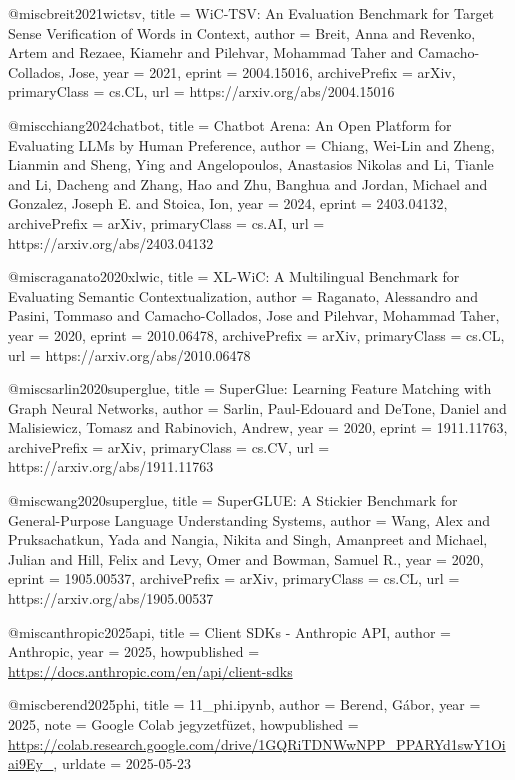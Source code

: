 \documentclass[12pt]{report}
\theoremstyle{definition}
\begin{document}
@misc{breit2021wictsv,
  title = {{WiC-TSV}: An Evaluation Benchmark for Target Sense Verification of Words in Context},
  author = {Breit, Anna and Revenko, Artem and Rezaee, Kiamehr and Pilehvar, Mohammad Taher and Camacho-Collados, Jose},
  year = {2021},
  eprint = {2004.15016},
  archivePrefix = {arXiv},
  primaryClass = {cs.CL},
  url = {https://arxiv.org/abs/2004.15016}
}

@misc{chiang2024chatbot,
  title = {Chatbot Arena: An Open Platform for Evaluating {LLMs} by Human Preference},
  author = {Chiang, Wei-Lin and Zheng, Lianmin and Sheng, Ying and Angelopoulos, Anastasios Nikolas and Li, Tianle and Li, Dacheng and Zhang, Hao and Zhu, Banghua and Jordan, Michael and Gonzalez, Joseph E. and Stoica, Ion},
  year = {2024},
  eprint = {2403.04132},
  archivePrefix = {arXiv},
  primaryClass = {cs.AI},
  url = {https://arxiv.org/abs/2403.04132}
}

@misc{raganato2020xlwic,
  title = {{XL-WiC}: A Multilingual Benchmark for Evaluating Semantic Contextualization},
  author = {Raganato, Alessandro and Pasini, Tommaso and Camacho-Collados, Jose and Pilehvar, Mohammad Taher},
  year = {2020},
  eprint = {2010.06478},
  archivePrefix = {arXiv},
  primaryClass = {cs.CL},
  url = {https://arxiv.org/abs/2010.06478}
}

@misc{sarlin2020superglue,
  title = {{SuperGlue}: Learning Feature Matching with Graph Neural Networks},
  author = {Sarlin, Paul-Edouard and DeTone, Daniel and Malisiewicz, Tomasz and Rabinovich, Andrew},
  year = {2020},
  eprint = {1911.11763},
  archivePrefix = {arXiv},
  primaryClass = {cs.CV},
  url = {https://arxiv.org/abs/1911.11763}
}

@misc{wang2020superglue,
  title = {{SuperGLUE}: A Stickier Benchmark for General-Purpose Language Understanding Systems},
  author = {Wang, Alex and Pruksachatkun, Yada and Nangia, Nikita and Singh, Amanpreet and Michael, Julian and Hill, Felix and Levy, Omer and Bowman, Samuel R.},
  year = {2020},
  eprint = {1905.00537},
  archivePrefix = {arXiv},
  primaryClass = {cs.CL},
  url = {https://arxiv.org/abs/1905.00537}
}

@misc{anthropic2025api,
  title = {Client {SDKs} - {Anthropic} {API}},
  author = {Anthropic},
  year = {2025},
  howpublished = {\url{https://docs.anthropic.com/en/api/client-sdks}}
}

@misc{berend2025phi,
  title = {11\_phi.ipynb},
  author = {Berend, Gábor},
  year = {2025},
  note = {Google Colab jegyzetfüzet},
  howpublished = {\url{https://colab.research.google.com/drive/1GQRiTDNWwNPP_PPARYd1swY1Oiai9Ey_}},
  urldate = {2025-05-23}
}
\end{document}
